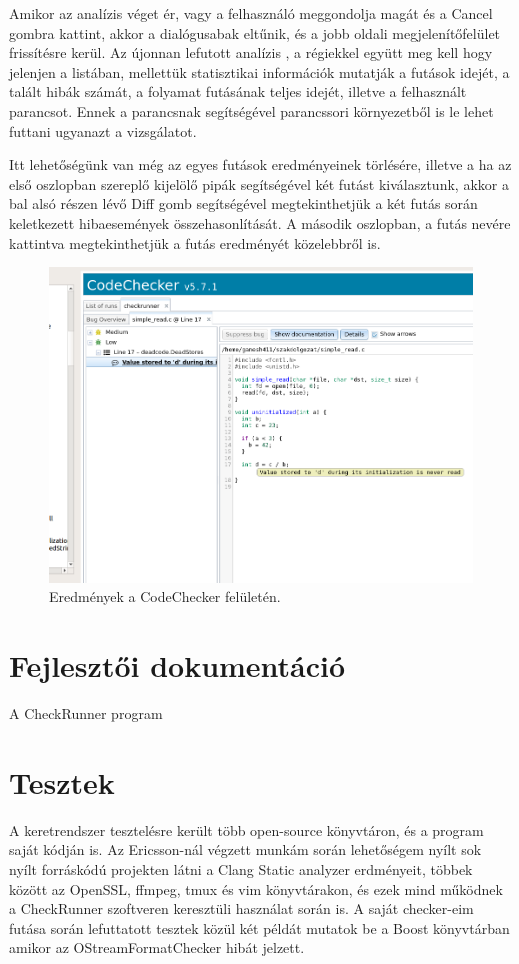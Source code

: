 \documentclass[a4paper,12pt]{report}
\begin{document}
Amikor az analízis véget ér, vagy a felhasználó meggondolja magát és a Cancel gombra kattint, akkor a dialógusabak eltűnik, és a jobb oldali megjelenítőfelület frissítésre kerül. Az újonnan lefutott analízis , a régiekkel együtt meg kell hogy jelenjen a listában, mellettük statisztikai információk mutatják a futások idejét, a talált hibák számát, a folyamat futásának teljes idejét, illetve a felhasznált parancsot. Ennek a parancsnak segítségével parancssori környezetből is le lehet futtani ugyanazt a vizsgálatot.

Itt lehetőségünk van még az egyes futások eredményeinek törlésére, illetve a ha az első oszlopban szereplő kijelölő pipák segítségével két futást kiválasztunk, akkor a bal alsó részen lévő Diff gomb segítségével megtekinthetjük a két futás során keletkezett hibaesemények összehasonlítását. A második oszlopban, a futás nevére kattintva megtekinthetjük a futás eredményét közelebbről is.

\begin{figure}[h]
\caption{Eredmények a CodeChecker felületén.}
\centering
\includegraphics[scale=0.4]{ui_results_open.png}
\end{figure}

\chapter{Fejlesztői dokumentáció}

A CheckRunner program


\chapter{Tesztek}
A keretrendszer tesztelésre került több open-source könyvtáron, és a program saját kódján is. Az Ericsson-nál végzett munkám során lehetőségem nyílt sok nyílt forráskódú projekten látni a Clang Static analyzer erdményeit, többek között az OpenSSL, ffmpeg, tmux és vim könyvtárakon, és ezek mind működnek a CheckRunner szoftveren keresztüli használat során is. A saját checker-eim futása során lefuttatott tesztek közül két példát mutatok be a Boost könyvtárban amikor az OStreamFormatChecker hibát jelzett.
\end{document}
